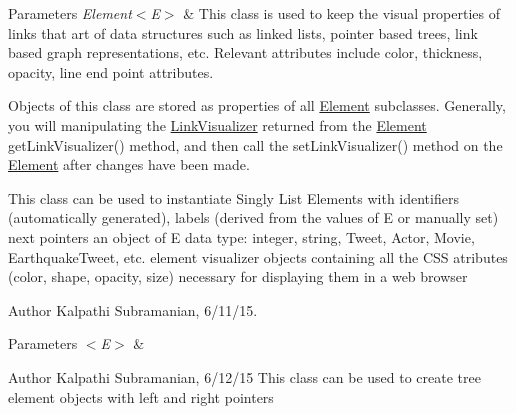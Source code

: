\begin{DoxyParams}{Parameters}
{\em Element$<$\+E$>$} & This class is used to keep the visual properties of links that art of data structures such as linked lists, pointer based trees, link based graph representations, etc. Relevant attributes include color, thickness, opacity, line end point attributes. \\
\hline
\end{DoxyParams}
Objects of this class are stored as properties of all \hyperlink{classbridges_1_1_element}{Element} subclasses. Generally, you will manipulating the \hyperlink{classbridges_1_1_link_visualizer}{Link\+Visualizer} returned from the \hyperlink{classbridges_1_1_element}{Element} get\+Link\+Visualizer() method, and then call the set\+Link\+Visualizer() method on the \hyperlink{classbridges_1_1_element}{Element} after changes have been made.

This class can be used to instantiate Singly List Elements with identifiers (automatically generated), labels (derived from the values of E or manually set) next pointers an object of E data type\+: integer, string, Tweet, Actor, Movie, Earthquake\+Tweet, etc. element visualizer objects containing all the C\+S\+S atributes (color, shape, opacity, size) necessary for displaying them in a web browser \begin{DoxyAuthor}{Author}
Kalpathi Subramanian, 6/11/15.
\end{DoxyAuthor}

\begin{DoxyParams}{Parameters}
{\em $<$\+E$>$} & \\
\hline
\end{DoxyParams}
\begin{DoxyAuthor}{Author}
Kalpathi Subramanian, 6/12/15 This class can be used to create tree element objects with left and right pointers 
\end{DoxyAuthor}
